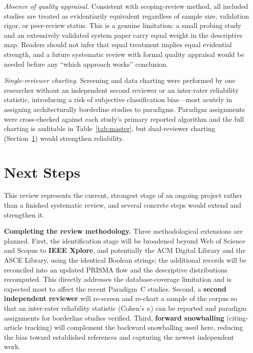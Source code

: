 \documentclass[10pt,letterpaper]{article}
\begin{document}
\textit{Absence of quality appraisal.} Consistent with scoping-review method, all included studies are treated as evidentiarily equivalent regardless of sample size, validation rigor, or peer-review status. This is a genuine limitation: a small probing study and an extensively validated system paper carry equal weight in the descriptive map. Readers should not infer that equal treatment implies equal evidential strength, and a future systematic review with formal quality appraisal would be needed before any ``which approach works'' conclusion.

\textit{Single-reviewer charting.} Screening and data charting were performed by one researcher without an independent second reviewer or an inter-rater reliability statistic, introducing a risk of subjective classification bias---most acutely in assigning architecturally borderline studies to paradigms. Paradigm assignments were cross-checked against each study's primary reported algorithm and the full charting is auditable in Table~\ref{tab:master}, but dual-reviewer charting (Section~\ref{sec:nextsteps}) would strengthen reliability.

\section{Next Steps}
\label{sec:nextsteps}

This review represents the current, strongest stage of an ongoing project rather than a finished systematic review, and several concrete steps would extend and strengthen it.

\textbf{Completing the review methodology.} Three methodological extensions are planned. First, the identification stage will be broadened beyond Web of Science and Scopus to \textbf{IEEE Xplore}, and potentially the ACM Digital Library and the ASCE Library, using the identical Boolean strings; the additional records will be reconciled into an updated PRISMA flow and the descriptive distributions recomputed. This directly addresses the database-coverage limitation and is expected most to affect the recent Paradigm~C studies. Second, a \textbf{second independent reviewer} will re-screen and re-chart a sample of the corpus so that an inter-rater reliability statistic (Cohen's $\kappa$) can be reported and paradigm assignments for borderline studies verified. Third, \textbf{forward snowballing} (citing-article tracking) will complement the backward snowballing used here, reducing the bias toward established references and capturing the newest independent work.
\end{document}
